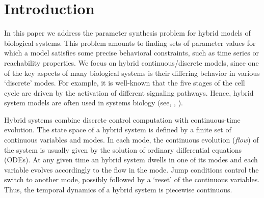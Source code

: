 \section{Introduction}


In this paper we address the parameter synthesis problem for hybrid models of biological systems.
This problem amounts to finding sets of parameter values for which a model satisfies some precise 
behavioral constraints, such as time series or reachability properties. We focus on hybrid 
continuous/discrete models, since one of the key aspects of many biological systems is their differing 
behavior in various `discrete' modes. For example, it is well-known that the five stages of the cell 
cycle are driven by the activation of different signaling pathways. Hence, hybrid system models are often 
used in systems biology (see, \eg, 
\citep{tomlin04,Hu04,ye08,aihara10,antoniotti03,lincoln04,baldazzi11}).

Hybrid systems combine discrete control computation with continuous-time evolution. The state space 
of a hybrid system is defined by a finite set of continuous variables and modes. In each mode, the
continuous evolution ({\em flow}) of the system is usually given by the solution of ordinary differential
equations (ODEs). At any given time an hybrid system dwells in one of its modes and each variable 
evolves accordingly to the flow in the mode. Jump conditions control the switch to another mode,
possibly followed by a `reset' of the continuous variables. Thus, the temporal dynamics of a 
hybrid system is piecewise continuous.

